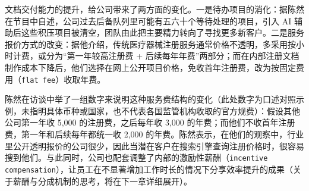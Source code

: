 \documentclass[UTF8,a4paper,11pt,fontset=fandol]{ctexart}
\begin{document}
文档交付能力的提升，给公司带来了两方面的变化。一是待办项目的消化：据陈然在节目中自述，公司过去后备队列里可能有五六十个等待处理的项目，引入 AI 辅助后这些积压项目被清空，团队由此把主要精力转向了寻找更多新客户。二是服务报价方式的改变：据他介绍，传统医疗器械注册服务通常价格不透明，多采用按小时计费，或分为“第一年较高注册费 + 后续每年年费”两部分；而在内部注册文档制作成本下降后，他们选择在网上公开项目价格，免收首年注册费，改为按固定费用（\texttt{flat fee}）收取年费。

陈然在访谈中举了一组数字来说明这种服务费结构的变化（此处数字为口述对照示例，未指明具体币种或国家，也不代表各国监管机构收取的官方规费）：假设其他公司第一年收 5,000 的注册费，之后每年收 3,000 的年费；而他们不收首年注册费，第一年和后续每年都统一收 2,000 的年费。陈然表示，在他们的观察中，行业里公开透明报价的公司很少，因此当潜在客户在搜索引擎查询注册价格时，很容易搜到他们。与此同时，公司也配套调整了内部的激励性薪酬（\texttt{incentive compensation}），让员工在不显著增加工作时长的情况下分享效率提升的成果（关于薪酬与分成机制的思考，将在下一章详细展开）。
\end{document}
